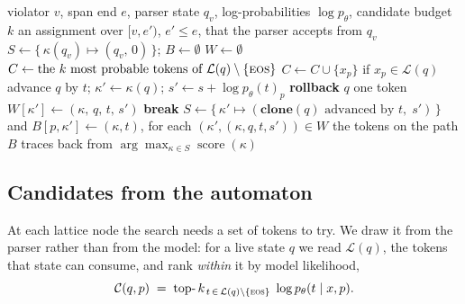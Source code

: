 \documentclass{article}
\begin{document}
\begin{algorithm}[t]
\caption{Joint repair of a violated span}
\label{alg:dp}
\begin{algorithmic}[1]
\Require violator $v$, span end $e$, parser state $q_v$, log-probabilities
$\log p_\theta$, candidate budget $k$
\Ensure an assignment over $[v,e')$, $e'\!\le\!e$, that the parser accepts from $q_v$
\State $S \gets \{\,\kappa(q_v)\mapsto(q_v,\,0)\,\}$; \;\; $B \gets \emptyset$ 
  \State $W \gets \emptyset$ 
    \State $C \gets \text{the } k \text{ most probable tokens of } \mathcal{L}(q)\setminus\{\textsc{eos}\}$ \Comment{\S\ref{sec:cand}}
    \State $C \gets C \cup \{x_p\}$ if $x_p \in \mathcal{L}(q)$ 
      \State advance $q$ by $t$; \; $\kappa' \gets \kappa(q)$; \; $s' \gets s + \log p_\theta(t)_p$
      \State \textbf{rollback} $q$ one token 
        \State $W[\kappa'] \gets (\kappa,\,q,\,t,\,s')$ 
      \EndIf
    \EndFor
  \EndFor
    \State \textbf{break} 
  \EndIf
  \State $S \gets \{\,\kappa' \mapsto (\textbf{clone}(q)\text{ advanced by }t,\; s')\,\}$ and $B[p,\kappa'] \gets (\kappa,t)$, for each $(\kappa',(\kappa,q,t,s')) \in W$
\EndFor
\State \Return the tokens on the path $B$ traces back from $\arg\max_{\kappa\in S}\operatorname{score}(\kappa)$
\end{algorithmic}
\end{algorithm}

\subsection{Candidates from the automaton}
\label{sec:cand}

At each lattice node the search needs a set of tokens to try. We draw it from
the parser rather than from the model: for a live state $q$ we read
$\mathcal{L}(q)$, the tokens that state can consume, and rank \emph{within} it
by model likelihood,
\begin{equation}
\label{eq:cand}
\mathcal{C}(q,p) \;=\; \operatorname*{top-}k_{\,t\,\in\,\mathcal{L}(q)\setminus\{\textsc{eos}\}}\; \log p_\theta(t\mid x,p).
\end{equation}
\end{document}
